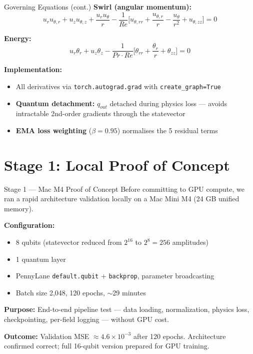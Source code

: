 \documentclass[aspectratio=169]{beamer}
\begin{document}
\begin{frame}{Governing Equations (cont.)}
\textbf{Swirl (angular momentum):}
\[ u_r u_{\theta,r} + u_z u_{\theta,z} + \frac{u_r u_\theta}{r} - \frac{1}{Re}\Big[u_{\theta,rr} + \frac{u_{\theta,r}}{r} - \frac{u_\theta}{r^2} + u_{\theta,zz}\Big] = 0 \]

\textbf{Energy:}
\[ u_r \theta_r + u_z \theta_z - \frac{1}{Pr \cdot Re}\Big[\theta_{rr} + \frac{\theta_r}{r} + \theta_{zz}\Big] = 0 \]

\vspace{0.4cm}
\textbf{Implementation:}
\begin{itemize}
  \item All derivatives via \texttt{torch.autograd.grad} with \texttt{create\_graph=True}
  \item \textbf{Quantum detachment:} $q_{out}$ detached during physics loss --- avoids intractable 2nd-order gradients through the statevector
  \item \textbf{EMA loss weighting} ($\beta=0.95$) normalises the 5 residual terms
\end{itemize}
\end{frame}

\section{Stage 1: Local Proof of Concept}

\begin{frame}{Stage 1 --- Mac M4 Proof of Concept}
Before committing to GPU compute, we ran a rapid architecture validation locally on a Mac Mini M4 (24 GB unified memory).

\vspace{0.3cm}
\textbf{Configuration:}
\begin{itemize}
  \item 8 qubits (statevector reduced from $2^{16}$ to $2^8=256$ amplitudes)
  \item 1 quantum layer
  \item PennyLane \texttt{default.qubit} + \texttt{backprop}, parameter broadcasting
  \item Batch size 2,048, 120 epochs, $\sim$29 minutes
\end{itemize}

\vspace{0.3cm}
\textbf{Purpose:} End-to-end pipeline test --- data loading, normalization, physics loss, checkpointing, per-field logging --- without GPU cost.

\vspace{0.3cm}
\textbf{Outcome:} Validation MSE $\approx 4.6\times10^{-3}$ after 120 epochs. Architecture confirmed correct; full 16-qubit version prepared for GPU training.
\end{frame}
\end{document}
